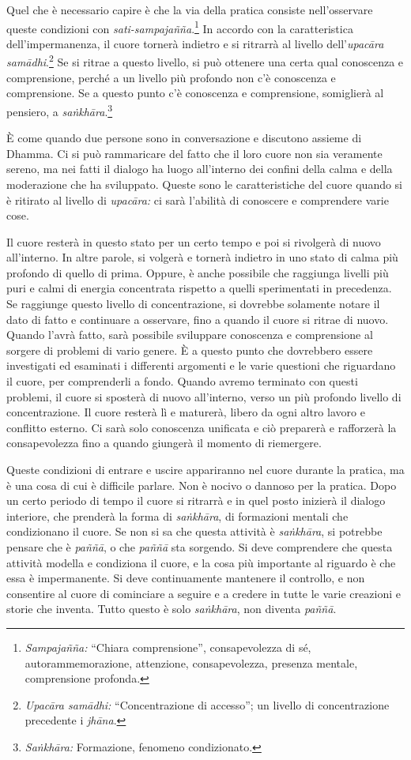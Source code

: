 Quel che è necessario capire è che la via della pratica consiste
nell'osservare queste condizioni con \emph{sati-sampajañña}.\footnote{\emph{Sampajañña:}
  ``Chiara comprensione'', consapevolezza di sé, autorammemorazione,
  attenzione, consapevolezza, presenza mentale, comprensione profonda.}
In accordo con la caratteristica dell'impermanenza, il cuore tornerà
indietro e si ritrarrà al livello dell'\emph{upacāra samādhi}.\footnote{\emph{Upacāra samādhi:}
  ``Concentrazione di accesso''; un livello di concentrazione precedente
  i \emph{jhāna}.} Se si ritrae a questo livello, si può ottenere una
certa qual conoscenza e comprensione, perché a un livello più profondo
non c'è conoscenza e comprensione. Se a questo punto c'è conoscenza e
comprensione, somiglierà al pensiero, a \emph{saṅkhāra}.\footnote{\emph{Saṅkhāra:}
  Formazione, fenomeno condizionato.}

È come quando due persone sono in conversazione e discutono assieme di
Dhamma. Ci si può rammaricare del fatto che il loro cuore non sia
veramente sereno, ma nei fatti il dialogo ha luogo all'interno dei
confini della calma e della moderazione che ha sviluppato. Queste sono
le caratteristiche del cuore quando si è ritirato al livello di
\emph{upacāra:} ci sarà l'abilità di conoscere e comprendere varie cose.

Il cuore resterà in questo stato per un certo tempo e poi si rivolgerà
di nuovo all'interno. In altre parole, si volgerà e tornerà indietro in
uno stato di calma più profondo di quello di prima. Oppure, è anche
possibile che raggiunga livelli più puri e calmi di energia concentrata
rispetto a quelli sperimentati in precedenza. Se raggiunge questo
livello di concentrazione, si dovrebbe solamente notare il dato di fatto
e continuare a osservare, fino a quando il cuore si ritrae di nuovo.
Quando l'avrà fatto, sarà possibile sviluppare conoscenza e comprensione
al sorgere di problemi di vario genere. È a questo punto che dovrebbero
essere investigati ed esaminati i differenti argomenti e le varie
questioni che riguardano il cuore, per comprenderli a fondo. Quando
avremo terminato con questi problemi, il cuore si sposterà di nuovo
all'interno, verso un più profondo livello di concentrazione. Il cuore
resterà lì e maturerà, libero da ogni altro lavoro e conflitto esterno.
Ci sarà solo conoscenza unificata e ciò preparerà e rafforzerà la
consapevolezza fino a quando giungerà il momento di riemergere.

Queste condizioni di entrare e uscire appariranno nel cuore durante la
pratica, ma è una cosa di cui è difficile parlare. Non è nocivo o
dannoso per la pratica. Dopo un certo periodo di tempo il cuore si
ritrarrà e in quel posto inizierà il dialogo interiore, che prenderà la
forma di \emph{saṅkhāra}, di formazioni mentali che condizionano il
cuore. Se non si sa che questa attività è \emph{saṅkhāra}, si potrebbe
pensare che è \emph{paññā}, o che \emph{paññā} sta sorgendo. Si deve
comprendere che questa attività modella e condiziona il cuore, e la cosa
più importante al riguardo è che essa è impermanente. Si deve
continuamente mantenere il controllo, e non consentire al cuore di
cominciare a seguire e a credere in tutte le varie creazioni e storie
che inventa. Tutto questo è solo \emph{saṅkhāra}, non diventa
\emph{paññā}.

